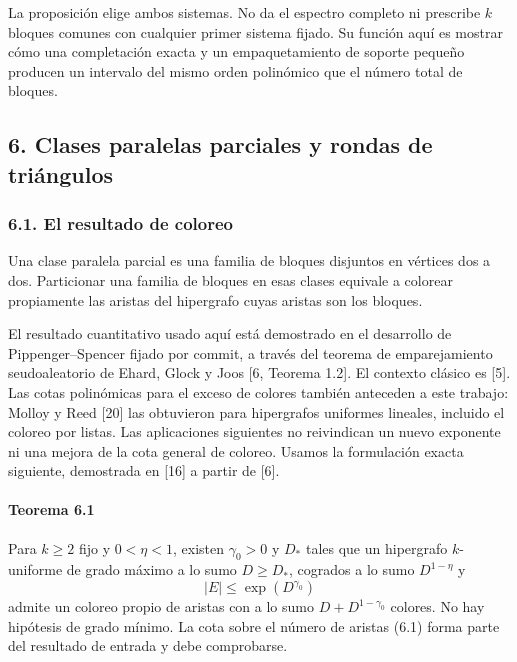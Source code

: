 \documentclass[spanish,11pt,a4paper]{article}
\begin{document}
La proposición elige ambos sistemas. No da el espectro completo ni prescribe \(k\) bloques comunes con cualquier primer sistema fijado. Su función aquí es mostrar cómo una completación exacta y un empaquetamiento de soporte pequeño producen un intervalo del mismo orden polinómico que el número total de bloques.

\subsection{6. Clases paralelas parciales y rondas de triángulos}\label{clases-paralelas-parciales-y-rondas-de-triuxe1ngulos}


\subsubsection{6.1. El resultado de coloreo}\label{el-resultado-de-coloreo}

Una clase paralela parcial es una familia de bloques disjuntos en vértices dos a dos. Particionar una familia de bloques en esas clases equivale a colorear propiamente las aristas del hipergrafo cuyas aristas son los bloques.

El resultado cuantitativo usado aquí está demostrado en el desarrollo de Pippenger--Spencer fijado por commit, a través del teorema de emparejamiento seudoaleatorio de Ehard, Glock y Joos {[}6, Teorema 1.2{]}. El contexto clásico es {[}5{]}. Las cotas polinómicas para el exceso de colores también anteceden a este trabajo: Molloy y Reed {[}20{]} las obtuvieron para hipergrafos uniformes lineales, incluido el coloreo por listas. Las aplicaciones siguientes no reivindican un nuevo exponente ni una mejora de la cota general de coloreo. Usamos la formulación exacta siguiente, demostrada en {[}16{]} a partir de {[}6{]}.

\par
\begin{samepage}
\paragraph{Teorema 6.1}\label{teorema-6.1}

Para \(k\ge2\) fijo y \(0<\eta<1\), existen \(\gamma_0>0\) y \(D_*\) tales que un hipergrafo \(k\)-uniforme de grado máximo a lo sumo \(D\ge D_*\), cogrados a lo sumo \(D^{1-\eta}\) y \[|E|\le\exp(D^{\gamma_0})
\tag{6.1}\] admite un coloreo propio de aristas con a lo sumo \(D+D^{1-\gamma_0}\) colores. No hay hipótesis de grado mínimo. La cota sobre el número de aristas (6.1) forma parte del resultado de entrada y debe comprobarse.


\end{samepage}
\end{document}
